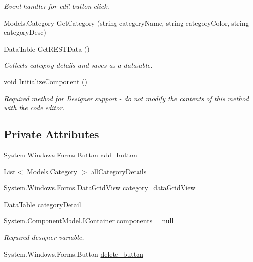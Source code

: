 \begin{DoxyCompactItemize}
\begin{DoxyCompactList}\small\item\em Event handler for edit button click. \end{DoxyCompactList}\item 
\hyperlink{classWildlifeTrackingApp_1_1Models_1_1Category}{Models.\+Category} \hyperlink{classWildlifeTrackingApp_1_1Category_ad0b8994ac9ba019fb7cd6564e0ce4234}{Get\+Category} (string category\+Name, string category\+Color, string category\+Desc)
\item 
Data\+Table \hyperlink{classWildlifeTrackingApp_1_1Category_a8e22ded5eb81e2790b567eb19d3fe373}{Get\+R\+E\+S\+T\+Data} ()
\begin{DoxyCompactList}\small\item\em Collects categroy details and saves as a datatable. \end{DoxyCompactList}\item 
void \hyperlink{classWildlifeTrackingApp_1_1Category_a6405d5db675d5338663195a4d12b4c9f}{Initialize\+Component} ()
\begin{DoxyCompactList}\small\item\em Required method for Designer support -\/ do not modify the contents of this method with the code editor. \end{DoxyCompactList}\end{DoxyCompactItemize}
\subsection*{Private Attributes}
\begin{DoxyCompactItemize}
\item 
System.\+Windows.\+Forms.\+Button \hyperlink{classWildlifeTrackingApp_1_1Category_a7f1dbd5813451728f923cb88a3469cb6}{add\+\_\+button}
\item 
List$<$ \hyperlink{classWildlifeTrackingApp_1_1Models_1_1Category}{Models.\+Category} $>$ \hyperlink{classWildlifeTrackingApp_1_1Category_a02effa079a870eac99d658ab96077499}{all\+Category\+Details}
\item 
System.\+Windows.\+Forms.\+Data\+Grid\+View \hyperlink{classWildlifeTrackingApp_1_1Category_aca0b56eba54545e931661b3e3661c34b}{category\+\_\+data\+Grid\+View}
\item 
Data\+Table \hyperlink{classWildlifeTrackingApp_1_1Category_a205fdcaba6d0c0047179a287f02825cf}{category\+Detail}
\item 
System.\+Component\+Model.\+I\+Container \hyperlink{classWildlifeTrackingApp_1_1Category_a02595f1c09713bb71dcb2fbbfc7ffa4b}{components} = null
\begin{DoxyCompactList}\small\item\em Required designer variable. \end{DoxyCompactList}\item 
System.\+Windows.\+Forms.\+Button \hyperlink{classWildlifeTrackingApp_1_1Category_a84dcb7863c4f709001a644ff98f22414}{delete\+\_\+button}
\end{DoxyCompactItemize}
